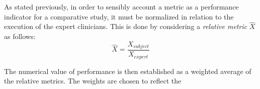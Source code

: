 \documentclass[../main.tex]{subfiles}
\begin{document}
As stated previously, in order to sensibly account a metric as a performance indicator for a comparative study, it must be normalized in relation to the execution of the expert clinicians. This is done by considering a \textit{relative metric} $\hat{X}$ as follows:
\begin{equation}
    \hat{X} = \frac{X_{subject}}{X_{expert}}
\end{equation}

The numerical value of performance is then established as a weighted average of the relative metrics. The weights are chosen to reflect the   

% 
% 
\end{document}
